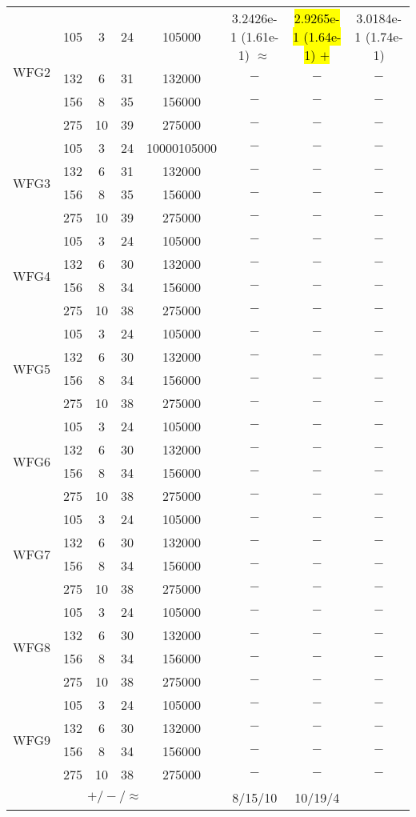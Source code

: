 \documentclass[journal]{IEEEtran}
\begin{document}
\begin{table*}[htbp]
\begin{tabular}{cccccccc}
            \hline
            \multirow{4}{*}{WFG2}&105&3&24&105000&3.2426e-1 (1.61e-1) $\approx$&\hl{2.9265e-1 (1.64e-1) $+$}&3.0184e-1 (1.74e-1)\\
            &132&6&31&132000&$-$&$-$&$-$\\
            &156&8&35&156000&$-$&$-$&$-$\\
            &275&10&39&275000&$-$&$-$&$-$\\
            \hline
            \multirow{4}{*}{WFG3}&105&3&24&10000105000&$-$&$-$&$-$\\
            &132&6&31&132000&$-$&$-$&$-$\\
            &156&8&35&156000&$-$&$-$&$-$\\
            &275&10&39&275000&$-$&$-$&$-$\\
            \hline
            \multirow{4}{*}{WFG4}&105&3&24&105000&$-$&$-$&$-$\\
            &132&6&30&132000&$-$&$-$&$-$\\
            &156&8&34&156000&$-$&$-$&$-$\\
            &275&10&38&275000&$-$&$-$&$-$\\
            \hline
            \multirow{4}{*}{WFG5}&105&3&24&105000&$-$&$-$&$-$\\
            &132&6&30&132000&$-$&$-$&$-$\\
            &156&8&34&156000&$-$&$-$&$-$\\
            &275&10&38&275000&$-$&$-$&$-$\\
            \hline
            \multirow{4}{*}{WFG6}&105&3&24&105000&$-$&$-$&$-$\\
            &132&6&30&132000&$-$&$-$&$-$\\
            &156&8&34&156000&$-$&$-$&$-$\\
            &275&10&38&275000&$-$&$-$&$-$\\
            \hline
            \multirow{4}{*}{WFG7}&105&3&24&105000&$-$&$-$&$-$\\
            &132&6&30&132000&$-$&$-$&$-$\\
            &156&8&34&156000&$-$&$-$&$-$\\
            &275&10&38&275000&$-$&$-$&$-$\\
            \hline
            \multirow{4}{*}{WFG8}&105&3&24&105000&$-$&$-$&$-$\\
            &132&6&30&132000&$-$&$-$&$-$\\
            &156&8&34&156000&$-$&$-$&$-$\\
            &275&10&38&275000&$-$&$-$&$-$\\
            \hline
            \multirow{4}{*}{WFG9}&105&3&24&105000&$-$&$-$&$-$\\
            &132&6&30&132000&$-$&$-$&$-$\\
            &156&8&34&156000&$-$&$-$&$-$\\
            &275&10&38&275000&$-$&$-$&$-$\\
            \hline
            \multicolumn{5}{c}{$+/-/\approx$}&8/15/10&10/19/4&\\
            \bottomrule
        \end{tabular}
        \label{No Label}
    \end{table*}
\end{document}
